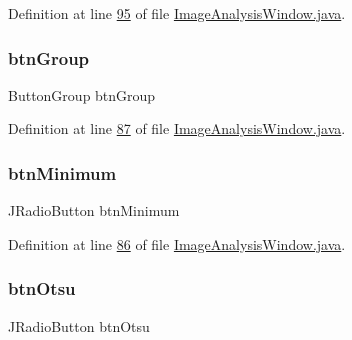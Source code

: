 Definition at line \hyperlink{_image_analysis_window_8java_source_l00095}{95} of file \hyperlink{_image_analysis_window_8java_source}{Image\+Analysis\+Window.\+java}.

\hypertarget{classgui_1_1_image_analysis_window_a16d71c0ff3c7b5f2d7298752a949fc71}{}\label{classgui_1_1_image_analysis_window_a16d71c0ff3c7b5f2d7298752a949fc71} 
\subsubsection{\texorpdfstring{btn\+Group}{btnGroup}}
{\footnotesize\ttfamily Button\+Group btn\+Group\hspace{0.3cm}{\ttfamily [protected]}}



Definition at line \hyperlink{_image_analysis_window_8java_source_l00087}{87} of file \hyperlink{_image_analysis_window_8java_source}{Image\+Analysis\+Window.\+java}.

\hypertarget{classgui_1_1_image_analysis_window_a0e7f4b261625dbbe93d3ac1bf2c645ad}{}\label{classgui_1_1_image_analysis_window_a0e7f4b261625dbbe93d3ac1bf2c645ad} 
\subsubsection{\texorpdfstring{btn\+Minimum}{btnMinimum}}
{\footnotesize\ttfamily J\+Radio\+Button btn\+Minimum\hspace{0.3cm}{\ttfamily [protected]}}



Definition at line \hyperlink{_image_analysis_window_8java_source_l00086}{86} of file \hyperlink{_image_analysis_window_8java_source}{Image\+Analysis\+Window.\+java}.

\hypertarget{classgui_1_1_image_analysis_window_a79b02cbaed083d22fac115fe05d1e8db}{}\label{classgui_1_1_image_analysis_window_a79b02cbaed083d22fac115fe05d1e8db} 
\subsubsection{\texorpdfstring{btn\+Otsu}{btnOtsu}}
{\footnotesize\ttfamily J\+Radio\+Button btn\+Otsu\hspace{0.3cm}{\ttfamily [protected]}}



